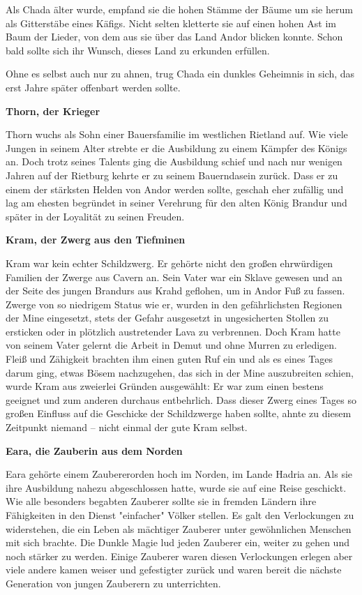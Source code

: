 \documentclass[10pt, a4paper, oneside]{book}
\begin{document}
\begin{multicols}{2}
Als Chada älter wurde, empfand sie die hohen Stämme der Bäume um sie herum als Gitterstäbe eines Käfigs. Nicht selten kletterte sie auf einen hohen Ast im Baum der Lieder, von dem aus sie über das Land Andor blicken konnte. Schon bald sollte sich ihr Wunsch, dieses Land zu erkunden erfüllen.

Ohne es selbst auch nur zu ahnen, trug Chada ein dunkles Geheimnis in sich, das erst Jahre später offenbart werden sollte.\bigskip

\textbf{Thorn, der Krieger}

Thorn wuchs als Sohn einer Bauersfamilie im westlichen Rietland auf. Wie viele Jungen in seinem Alter strebte er die Ausbildung zu einem Kämpfer des Königs an. Doch trotz seines Talents ging die Ausbildung schief und nach nur wenigen Jahren auf der Rietburg kehrte er zu seinem Bauerndasein zurück. Dass er zu einem der stärksten Helden von Andor werden sollte, geschah eher zufällig und lag am ehesten begründet in seiner Verehrung für den alten König Brandur und später in der Loyalität zu seinen Freuden.\bigskip

\textbf{Kram, der Zwerg aus den Tiefminen}

Kram war kein echter Schildzwerg. Er gehörte nicht den großen ehrwürdigen Familien der Zwerge aus Cavern an. Sein Vater war ein Sklave gewesen und an der Seite des jungen Brandurs aus Krahd geflohen, um in Andor Fuß zu fassen. Zwerge von so niedrigem Status wie er, wurden in den gefährlichsten Regionen der Mine eingesetzt, stets der Gefahr ausgesetzt in ungesicherten Stollen zu ersticken oder in plötzlich austretender Lava zu verbrennen. Doch Kram hatte von seinem Vater gelernt die Arbeit in Demut und ohne Murren zu erledigen. Fleiß und Zähigkeit brachten ihm einen guten Ruf ein und als es eines Tages darum ging, etwas Bösem nachzugehen, das sich in der Mine auszubreiten schien, wurde Kram aus zweierlei Gründen ausgewählt: Er war zum einen bestens geeignet und zum anderen durchaus entbehrlich. Dass dieser Zwerg eines Tages so großen Einfluss auf die Geschicke der Schildzwerge haben sollte, ahnte zu diesem Zeitpunkt niemand – nicht einmal der gute Kram selbst.\bigskip

\textbf{Eara, die Zauberin aus dem Norden}

Eara gehörte einem Zaubererorden hoch im Norden, im Lande Hadria an. Als sie ihre Ausbildung nahezu abgeschlossen hatte, wurde sie auf eine Reise geschickt. Wie alle besonders begabten Zauberer sollte sie in fremden Ländern ihre Fähigkeiten in den Dienst "einfacher" Völker stellen. Es galt den Verlockungen zu widerstehen, die ein Leben als mächtiger Zauberer unter gewöhnlichen Menschen mit sich brachte. Die Dunkle Magie lud jeden Zauberer ein, weiter zu gehen und noch stärker zu werden. Einige Zauberer waren diesen Verlockungen erlegen aber viele andere kamen weiser und gefestigter zurück und waren bereit die nächste Generation von jungen Zauberern zu unterrichten.


\end{multicols}
\end{document}
